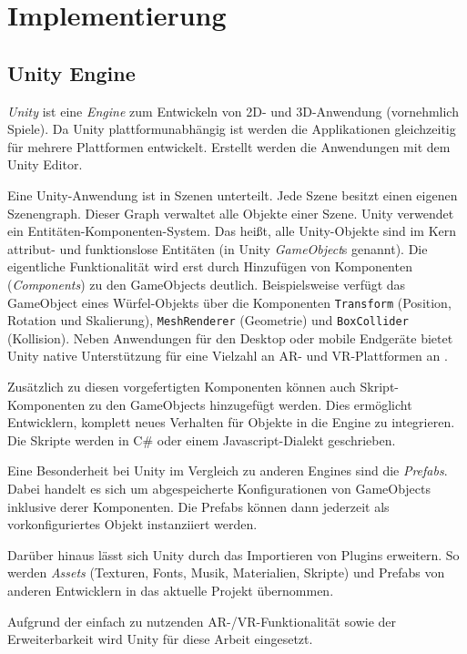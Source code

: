 \chapter{Implementierung}
\label{chap:implementation}

\section{Unity Engine}
\emph{Unity} \autocite{UnityTechnologies2018} ist eine \emph{Engine} zum Entwickeln von 2D- und 3D-Anwendung (vornehmlich Spiele).
Da Unity plattformunabhängig ist werden die Applikationen gleichzeitig für mehrere Plattformen entwickelt.
Erstellt werden die Anwendungen mit dem Unity Editor.

Eine Unity-Anwendung ist in Szenen unterteilt.
Jede Szene besitzt einen eigenen Szenengraph.
Dieser Graph verwaltet alle Objekte einer Szene.
Unity verwendet ein Entitäten-Komponenten-System.
Das heißt, alle Unity-Objekte sind im Kern attribut- und funktionslose Entitäten (in Unity \emph{GameObject}s genannt).
Die eigentliche Funktionalität wird erst durch Hinzufügen von Komponenten (\emph{Components}) zu den GameObjects deutlich.
Beispielsweise verfügt das GameObject eines Würfel-Objekts über die Komponenten \lstinline{Transform} (Position, Rotation und Skalierung), \lstinline{MeshRenderer} (Geometrie) und \lstinline{BoxCollider} (Kollision).
Neben Anwendungen für den Desktop oder mobile Endgeräte bietet Unity native Unterstützung für eine Vielzahl an AR- und VR-Plattformen an \parencite{UnityTechnologies2018b}.

Zusätzlich zu diesen vorgefertigten Komponenten können auch Skript-Komponenten zu den GameObjects hinzugefügt werden.
Dies ermöglicht Entwicklern, komplett neues Verhalten für Objekte in die Engine zu integrieren.
Die Skripte werden in C\# oder einem Javascript-Dialekt geschrieben.

Eine Besonderheit bei Unity im Vergleich zu anderen Engines sind die \emph{Prefabs}.
Dabei handelt es sich um abgespeicherte Konfigurationen von GameObjects inklusive derer Komponenten.
Die Prefabs können dann jederzeit als vorkonfiguriertes Objekt instanziiert werden.

Darüber hinaus lässt sich Unity durch das Importieren von Plugins erweitern.
So werden \emph{Assets} (Texturen, Fonts, Musik, Materialien, Skripte) und Prefabs von anderen Entwicklern in das aktuelle Projekt übernommen.

Aufgrund der einfach zu nutzenden AR-/VR-Funktionalität sowie der Erweiterbarkeit wird Unity für diese Arbeit eingesetzt.


